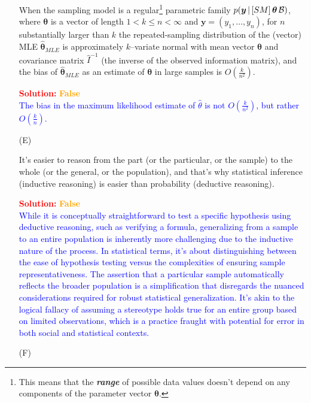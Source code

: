 \documentclass[12pt]{article}
\newcommand{\given}{\, | \,}
\newcommand{\bi}[1]{\b{\i{#1}}}
\renewcommand{\b}[1]{\textbf{#1}}
\renewcommand{\i}[1]{\textit{#1}}
\begin{document}
\begin{itemize}
When the sampling model is a regular\footnote{This means that the \bi{range} of possible data values doesn't depend on any components of the parameter vector $\bm{ \theta }$.} parametric family $p ( \bm{ y } \given [ SM ] \, \bm{ \theta } \, { \cal B } )$, where $\bm{ \theta }$ is a vector of length $1 < k \le n < \infty$ and $\bm{ y } = ( y_1, \dots, y_n )$, for $n$ substantially larger than $k$ the repeated-sampling distribution of the (vector) MLE $\hat{ \bm{ \theta } }_{ MLE }$ is approximately $k$--variate normal with mean vector $\bm{ \theta }$ and covariance matrix $\hat{ I }^{ -1 }$ (the inverse of the observed information matrix), and the bias of $\hat{ \bm{ \theta } }_{ MLE }$ as an estimate of $\bm{ \theta }$ in large samples is $O \! \left( \frac{ k }{ n^2 } \right)$. 

 \textcolor{red}{\textbf{Solution:}} \textbf{\textcolor{orange}{False}} \\
\textcolor{blue}{The bias in the maximum likelihood estimate of \(\hat{\theta}\) is not \(O\left(\frac{k}{n^2}\right)\), but rather \(O\left(\frac{k}{n}\right)\).}

\item[(E)]

It's easier to reason from the part (or the particular, or the sample) to
the whole (or the general, or the population), and that's why statistical
inference (inductive reasoning) is easier than probability (deductive
reasoning). 

 \textcolor{red}{\textbf{Solution:}} \textbf{\textcolor{orange}{False}} \\
\textcolor{blue}{While it is conceptually straightforward to test a specific hypothesis using deductive reasoning, such as verifying a formula, generalizing from a sample to an entire population is inherently more challenging due to the inductive nature of the process. In statistical terms, it's about distinguishing between the ease of hypothesis testing versus the complexities of ensuring sample representativeness. The assertion that a particular sample automatically reflects the broader population is a simplification that disregards the nuanced considerations required for robust statistical generalization. It's akin to the logical fallacy of assuming a stereotype holds true for an entire group based on limited observations, which is a practice fraught with potential for error in both social and statistical contexts.}

\item[(F)]


\end{itemize}
\end{document}
